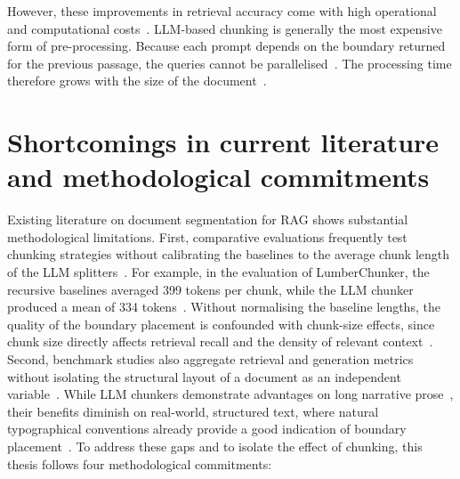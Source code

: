 However, these improvements in retrieval accuracy come with high operational and
computational costs~\cite{smigielski2026chunking}. LLM-based chunking is generally the most
expensive form of pre-processing. Because each prompt depends on the boundary returned for the previous
passage, the queries cannot be parallelised~\cite{duarte2024lumberchunker}. The processing
time therefore grows with the size of the document~\cite{duarte2024lumberchunker}.

\section{Shortcomings in current literature and methodological commitments}
\label{sec:commitments}

Existing literature on document segmentation for RAG shows substantial methodological
limitations. First, comparative evaluations frequently test chunking strategies without
calibrating the baselines to the average chunk length of the LLM
splitters~\cite{qu-etal-2025-semantic}. For example, in the evaluation of LumberChunker,
the recursive baselines averaged 399 tokens per chunk, while the LLM chunker produced a
mean of 334 tokens~\cite{duarte2024lumberchunker}. Without normalising the baseline
lengths, the quality of the boundary placement is confounded with chunk-size effects,
since chunk size directly affects retrieval recall and the density of relevant
context~\cite{qu-etal-2025-semantic}. Second, benchmark studies also aggregate retrieval
and generation metrics without isolating the structural layout of a document as an
independent variable~\cite{qu-etal-2025-semantic, smigielski2026chunking}. While LLM
chunkers demonstrate advantages on long narrative prose~\cite{duarte2024lumberchunker},
their benefits diminish on real-world, structured text, where natural typographical
conventions already provide a good indication of boundary
placement~\cite{qu-etal-2025-semantic}. To address these gaps and to isolate the effect of
chunking, this thesis follows four methodological commitments:
